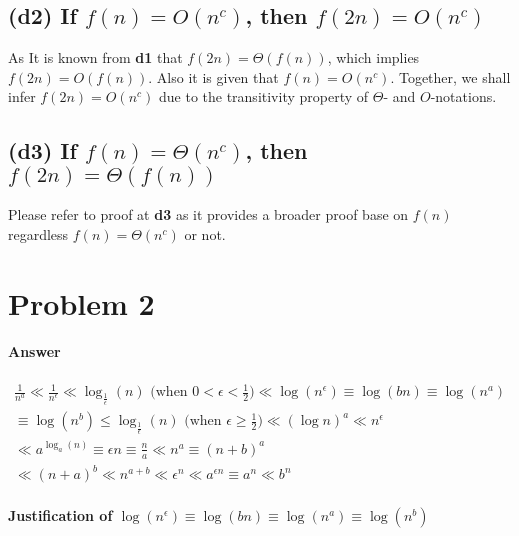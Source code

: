 \documentclass[12pt]{article}
\begin{document}
\subsection{(d2) If $f(n) = O(n^c)$, then $f(2n) = O(n^c)$}

As It is known from \textbf{d1} that $f(2n) = \Theta(f(n))$, which implies $f(2n) = O(f(n))$. Also it is given that $f(n) = O(n^c)$. Together, we shall infer $f(2n) = O(n^c)$ due to the transitivity property of $\Theta$- and $O$-notations.

\subsection{(d3) If $f(n) = \Theta(n^c)$, then $f(2n) = \Theta(f(n))$}
Please refer to proof at \textbf{d3} as it provides a broader proof base on $f(n)$ regardless $f(n) = \Theta(n^c)$ or not.


\section{Problem 2}

\paragraph{Answer}

\begin{gather}
    \frac{1}{n^a} \ll \frac{1}{n^\epsilon} \ll \log_{\frac{1}{\epsilon}}(n) \text{ \ (when $0 < \epsilon < \frac{1}{2}$)} \ll \log(n^\epsilon) \equiv \log(bn) \equiv \log(n^a) \\
    \equiv \log(n^b) \leq \log_{\frac{1}{\epsilon}}(n) \text{ \ (when $\epsilon \geq \frac{1}{2}$)} \ll (\log n)^a \ll n^{\epsilon} \\
    \ll a^{\log_a(n)} \equiv \epsilon n \equiv \frac{n}{a} \ll n^a \equiv (n+b)^a\\
    \ll (n+a)^b \ll n^{a+b} \ll \epsilon^n \ll a^{\epsilon n} \equiv a^n \ll b^n
\end{gather}


\paragraph{Justification of $\log(n^\epsilon) \equiv \log(bn) \equiv \log(n^a) \equiv \log(n^b)$\newline}
\end{document}
